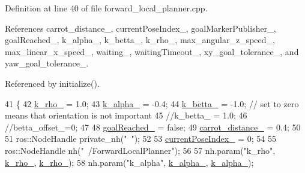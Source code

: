 Definition at line 40 of file forward\+\_\+local\+\_\+planner.\+cpp.



References carrot\+\_\+distance\+\_\+, current\+Pose\+Index\+\_\+, goal\+Marker\+Publisher\+\_\+, goal\+Reached\+\_\+, k\+\_\+alpha\+\_\+, k\+\_\+betta\+\_\+, k\+\_\+rho\+\_\+, max\+\_\+angular\+\_\+z\+\_\+speed\+\_\+, max\+\_\+linear\+\_\+x\+\_\+speed\+\_\+, waiting\+\_\+, waiting\+Timeout\+\_\+, xy\+\_\+goal\+\_\+tolerance\+\_\+, and yaw\+\_\+goal\+\_\+tolerance\+\_\+.



Referenced by initialize().


\begin{DoxyCode}
41 \{
42     \hyperlink{classcl__move__base__z_1_1forward__local__planner_1_1ForwardLocalPlanner_a8ad1b04b0bdaa8a7bb878f5e5cebd4f8}{k\_rho\_} = 1.0;
43     \hyperlink{classcl__move__base__z_1_1forward__local__planner_1_1ForwardLocalPlanner_a530117a51f06e426b6aacc08bbd38fff}{k\_alpha\_} = -0.4;
44     \hyperlink{classcl__move__base__z_1_1forward__local__planner_1_1ForwardLocalPlanner_a7b89ccccd288e5384154e7d5b64b4014}{k\_betta\_} = -1.0; \textcolor{comment}{// set to zero means that orientation is not important}
45     \textcolor{comment}{//k\_betta\_ = 1.0;}
46     \textcolor{comment}{//betta\_offset\_=0;}
47 
48     \hyperlink{classcl__move__base__z_1_1forward__local__planner_1_1ForwardLocalPlanner_a9d51ad6f0eb364ebd830526280bdf4fc}{goalReached\_} = \textcolor{keyword}{false};
49     \hyperlink{classcl__move__base__z_1_1forward__local__planner_1_1ForwardLocalPlanner_a4101afebb7e2a5eb0a2144a5fb553a92}{carrot\_distance\_} = 0.4;
50 
51     ros::NodeHandle private\_nh(\textcolor{stringliteral}{"~"});
52 
53     \hyperlink{classcl__move__base__z_1_1forward__local__planner_1_1ForwardLocalPlanner_af4019077a7661d10957cca16222547c2}{currentPoseIndex\_} = 0;
54 
55     ros::NodeHandle nh(\textcolor{stringliteral}{"~/ForwardLocalPlanner"});
56 
57     nh.param(\textcolor{stringliteral}{"k\_rho"}, \hyperlink{classcl__move__base__z_1_1forward__local__planner_1_1ForwardLocalPlanner_a8ad1b04b0bdaa8a7bb878f5e5cebd4f8}{k\_rho\_}, \hyperlink{classcl__move__base__z_1_1forward__local__planner_1_1ForwardLocalPlanner_a8ad1b04b0bdaa8a7bb878f5e5cebd4f8}{k\_rho\_});
58     nh.param(\textcolor{stringliteral}{"k\_alpha"}, \hyperlink{classcl__move__base__z_1_1forward__local__planner_1_1ForwardLocalPlanner_a530117a51f06e426b6aacc08bbd38fff}{k\_alpha\_}, \hyperlink{classcl__move__base__z_1_1forward__local__planner_1_1ForwardLocalPlanner_a530117a51f06e426b6aacc08bbd38fff}{k\_alpha\_});

\end{DoxyCode}
